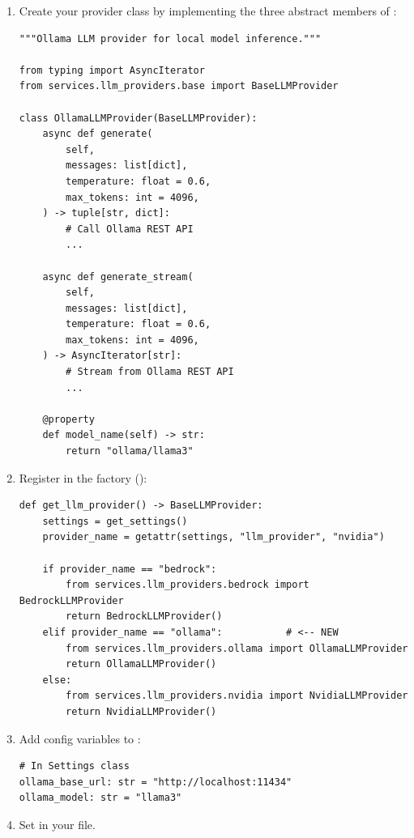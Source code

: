 \begin{enumerate}
    \item Create your provider class by implementing the three abstract
          members of :

\begin{lstlisting}[style=python, title=llm\_providers/ollama.py]
"""Ollama LLM provider for local model inference."""

from typing import AsyncIterator
from services.llm_providers.base import BaseLLMProvider

class OllamaLLMProvider(BaseLLMProvider):
    async def generate(
        self,
        messages: list[dict],
        temperature: float = 0.6,
        max_tokens: int = 4096,
    ) -> tuple[str, dict]:
        # Call Ollama REST API
        ...

    async def generate_stream(
        self,
        messages: list[dict],
        temperature: float = 0.6,
        max_tokens: int = 4096,
    ) -> AsyncIterator[str]:
        # Stream from Ollama REST API
        ...

    @property
    def model_name(self) -> str:
        return "ollama/llama3"
\end{lstlisting}

    \item Register in the factory
          ():

\begin{lstlisting}[style=python]
def get_llm_provider() -> BaseLLMProvider:
    settings = get_settings()
    provider_name = getattr(settings, "llm_provider", "nvidia")

    if provider_name == "bedrock":
        from services.llm_providers.bedrock import BedrockLLMProvider
        return BedrockLLMProvider()
    elif provider_name == "ollama":           # <-- NEW
        from services.llm_providers.ollama import OllamaLLMProvider
        return OllamaLLMProvider()
    else:
        from services.llm_providers.nvidia import NvidiaLLMProvider
        return NvidiaLLMProvider()
\end{lstlisting}

    \item Add config variables to :

\begin{lstlisting}[style=python]
# In Settings class
ollama_base_url: str = "http://localhost:11434"
ollama_model: str = "llama3"
\end{lstlisting}

    \item Set  in your  file.
\end{enumerate}

